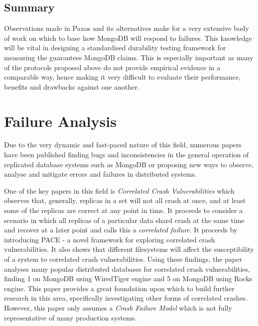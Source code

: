 \subsection{Summary}
Observations made in Paxos and its alternatives make for a very extensive body of work on which to base how MongoDB will respond to failures. This knowledge will be vital in designing a standardised durability testing framework for measuring the guarantees MongoDB claims. This is especially important as many of the protocols proposed above do not provide empirical evidence in a comparable way, hence making it very difficult to evaluate their performance, benefits and drawbacks against one another.

\section{Failure Analysis}
Due to the very dynamic and fast-paced nature of this field, numerous papers have been published finding bugs and inconsistencies in the general operation of replicated database systems such as MongoDB or proposing new ways to observe, analyse and mitigate errors and failures in distributed systems.

One of the key papers in this field is \textit{Correlated Crash Vulnerabilities} \citep{correlated-crash} which observes that, generally, replicas in a set will not all crash at once, and at least some of the replicas are correct at any point in time. It proceeds to consider a scenario in which all replicas of a particular data shard crash at the same time and recover at a later point and calls this a \textit{correlated failure}.  It proceeds by introducing PACE - a novel framework for exploring correlated crash vulnerabilities. It also shows that different filesystems will affect the susceptibility of a system to correlated crash vulnerabilities. Using these findings, the paper analyses many popular distributed databases for correlated crash vulnerabilities, finding 1 on MongoDB using WiredTiger engine and 5 on MongoDB using Rocks engine. This paper provides a great foundation upon which to build further research in this area, specifically investigating other forms of correlated crashes. However, this paper only assumes a \textit{Crash Failure Model} which is not fully representative of many production systems.

